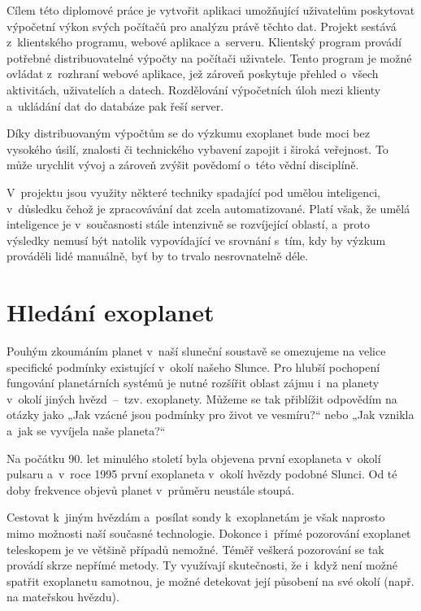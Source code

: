 \documentclass[a4paper,12pt]{article}
\begin{document}
Cílem této diplomové práce je vytvořit aplikaci umožňující uživatelům poskytovat výpočetní výkon svých počítačů pro analýzu právě těchto dat. Projekt sestává z~klientského programu, webové aplikace a~serveru. Klientský program provádí potřebné distribuovatelné výpočty na počítači uživatele. Tento program je možné ovládat z~rozhraní webové aplikace, jež zároveň poskytuje přehled o~všech aktivitách, uživatelích a datech. Rozdělování výpočetních úloh mezi klienty a~ukládání dat do databáze pak řeší server.

Díky distribuovaným výpočtům se do výzkumu exoplanet bude moci bez vysokého úsilí, znalosti či technického vybavení zapojit i široká veřejnost. To může urychlit vývoj a zároveň zvýšit povědomí o~této vědní disciplíně.

V~projektu jsou využity některé techniky spadající pod umělou inteligenci, v~důsledku čehož je zpracovávání dat zcela automatizované. Platí však, že umělá inteligence je v~současnosti stále intenzivně se rozvíjející oblastí, a~proto výsledky nemusí být natolik vypovídající ve srovnání s~tím, kdy by výzkum prováděli lidé manuálně, byť by to trvalo nesrovnatelně déle.

\section{Hledání exoplanet}

Pouhým zkoumáním planet v~naší sluneční soustavě se omezujeme na velice specifické podmínky existující v~okolí našeho Slunce. Pro hlubší pochopení fungování planetárních systémů je nutné rozšířit oblast zájmu i~na planety v~okolí jiných hvězd~--~tzv. exoplanety. Můžeme se tak přiblížit odpovědím na otázky jako „Jak vzácné jsou podmínky pro život ve vesmíru?“ nebo „Jak vznikla a~jak se vyvíjela naše planeta?“~\cite{exoplanets}

Na počátku 90. let minulého století byla objevena první exoplaneta v~okolí pulsaru a~v~roce 1995 první exoplaneta v~okolí hvězdy podobné Slunci. Od té doby frekvence objevů planet v~průměru neustále stoupá.~\cite{exoplanets,nasadata}


Cestovat k~jiným hvězdám a~posílat sondy k~exoplanetám je však naprosto mimo možnosti naší současné technologie. Dokonce i~přímé pozorování exoplanet teleskopem je ve většině případů nemožné. Téměř veškerá pozorování se tak provádí skrze nepřímé metody. Ty využívají skutečnosti, že i~když není možné spatřit exoplanetu samotnou, je možné detekovat její působení na své okolí (např. na mateřskou hvězdu).
\end{document}
